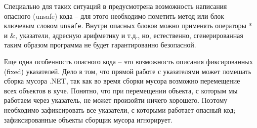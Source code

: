 Специально для таких ситуаций в \CSharp предусмотрена возможность написания опасного (unsafe) кода -- для этого необходимо пометить метод или блок ключевым словом \lstinline{unsafe}. Внутри опасных блоков можно применять операторы * и \&, указатели, адресную арифметику и т.д., но, естественно, сгенерированная таким образом программа не будет гарантированно безопасной.

Еще одна особенность опасного кода -- это возможность описания фиксированных (fixed) указателей. Дело в том, что прямой работе с указателями может помешать сборка мусора .NET, так как во время сборки мусора возможно перемещение всех объектов в куче. Понятно, что при перемещении объекта, с которым мы работаем через указатель, не может произойти ничего хорошего. Поэтому необходимо зафиксировать все указатели, с которыми работает опасный код; зафиксированные объекты сборщик мусора игнорирует.